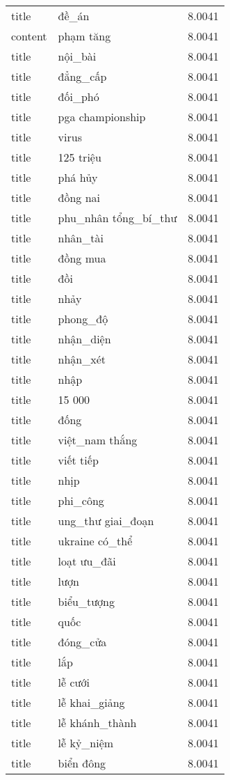 \documentclass{article}
\begin{document}
\begin{tabular}{lll}
title & đề\_án & 8.0041\\
content & phạm tăng & 8.0041\\
title & nội\_bài & 8.0041\\
title & đẳng\_cấp & 8.0041\\
title & đối\_phó & 8.0041\\
title & pga championship & 8.0041\\
title & virus & 8.0041\\
title & 125 triệu & 8.0041\\
title & phá hủy & 8.0041\\
title & đồng nai & 8.0041\\
title & phu\_nhân tổng\_bí\_thư & 8.0041\\
title & nhân\_tài & 8.0041\\
title & đồng mua & 8.0041\\
title & đồi & 8.0041\\
title & nhảy & 8.0041\\
title & phong\_độ & 8.0041\\
title & nhận\_diện & 8.0041\\
title & nhận\_xét & 8.0041\\
title & nhập & 8.0041\\
title & 15 000 & 8.0041\\
title & đống & 8.0041\\
title & việt\_nam thắng & 8.0041\\
title & viết tiếp & 8.0041\\
title & nhịp & 8.0041\\
title & phi\_công & 8.0041\\
title & ung\_thư giai\_đoạn & 8.0041\\
title & ukraine có\_thể & 8.0041\\
title & loạt ưu\_đãi & 8.0041\\
title & lượn & 8.0041\\
title & biểu\_tượng & 8.0041\\
title & quốc & 8.0041\\
title & đóng\_cửa & 8.0041\\
title & lắp & 8.0041\\
title & lễ cưới & 8.0041\\
title & lễ khai\_giảng & 8.0041\\
title & lễ khánh\_thành & 8.0041\\
title & lễ kỷ\_niệm & 8.0041\\
title & biển đông & 8.0041\\

\end{tabular}
\end{document}
